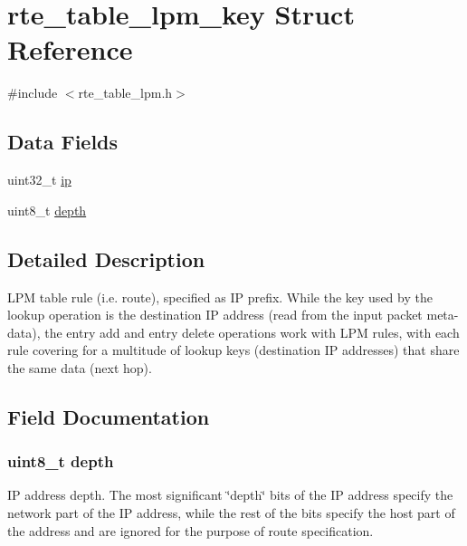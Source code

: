 \hypertarget{structrte__table__lpm__key}{}\section{rte\+\_\+table\+\_\+lpm\+\_\+key Struct Reference}
\label{structrte__table__lpm__key}


{\ttfamily \#include $<$rte\+\_\+table\+\_\+lpm.\+h$>$}

\subsection*{Data Fields}
\begin{DoxyCompactItemize}
\item 
uint32\+\_\+t \hyperlink{structrte__table__lpm__key_a69ddb9c845da426f636d9dd0dbed4e7e}{ip}
\item 
uint8\+\_\+t \hyperlink{structrte__table__lpm__key_ab6f276082172be43a6041212071e377b}{depth}
\end{DoxyCompactItemize}


\subsection{Detailed Description}
L\+P\+M table rule (i.\+e. route), specified as I\+P prefix. While the key used by the lookup operation is the destination I\+P address (read from the input packet meta-\/data), the entry add and entry delete operations work with L\+P\+M rules, with each rule covering for a multitude of lookup keys (destination I\+P addresses) that share the same data (next hop). 

\subsection{Field Documentation}
\hypertarget{structrte__table__lpm__key_ab6f276082172be43a6041212071e377b}{}
\subsubsection[{depth}]{\setlength{\rightskip}{0pt plus 5cm}uint8\+\_\+t depth}\label{structrte__table__lpm__key_ab6f276082172be43a6041212071e377b}
I\+P address depth. The most significant \char`\"{}depth\char`\"{} bits of the I\+P address specify the network part of the I\+P address, while the rest of the bits specify the host part of the address and are ignored for the purpose of route specification. \hypertarget{structrte__table__lpm__key_a69ddb9c845da426f636d9dd0dbed4e7e}{}
